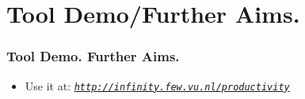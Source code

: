 \documentclass[10pt]{beamer}
\begin{document}
\section{Tool Demo/Further Aims.}


\begin{frame}%
  \frametitle{Tool Demo. Further Aims.}

  \vspace*{0.5ex}
  \begin{itemize}
    \item  %
      Use it at:
      \href{http://localhost/productivity}
           {\emph{\tt http://infinity.few.vu.nl/productivity}} 
  \end{itemize}





\end{frame}
\end{document}
